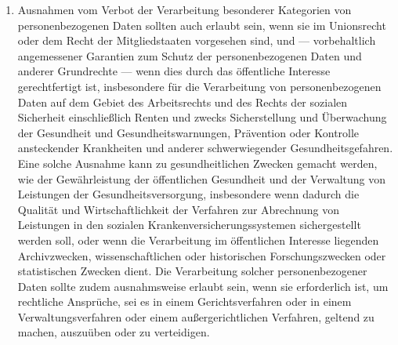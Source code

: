 \begin{enumerate}
   \item Ausnahmen vom Verbot der Verarbeitung besonderer Kategorien von personenbezogenen Daten sollten auch erlaubt
    sein, wenn sie im Unionsrecht oder dem Recht der Mitgliedstaaten vorgesehen sind, und — vorbehaltlich angemessener
    Garantien zum Schutz der personenbezogenen Daten und anderer Grundrechte — wenn dies durch das öffentliche
    Interesse gerechtfertigt ist, insbesondere für die Verarbeitung von personenbezogenen Daten auf dem Gebiet des
    Arbeitsrechts und des Rechts der sozialen Sicherheit einschließlich Renten und zwecks Sicherstellung und
    Überwachung der Gesundheit und Gesundheitswarnungen, Prävention oder Kontrolle ansteckender Krankheiten und anderer
    schwerwiegender Gesundheitsgefahren. Eine solche Ausnahme kann zu gesundheitlichen Zwecken gemacht werden, wie der
    Gewährleistung der öffentlichen Gesundheit und der Verwaltung von Leistungen der Gesundheitsversorgung,
    insbesondere wenn dadurch die Qualität und Wirtschaftlichkeit der Verfahren zur Abrechnung von Leistungen in den
    sozialen Krankenversicherungssystemen sichergestellt werden soll, oder wenn die Verarbeitung im öffentlichen
    Interesse liegenden Archivzwecken, wissenschaftlichen oder historischen Forschungszwecken oder statistischen
    Zwecken dient. Die Verarbeitung solcher personenbezogener Daten sollte zudem ausnahmsweise erlaubt sein, wenn sie
    erforderlich ist, um rechtliche Ansprüche, sei es in einem Gerichtsverfahren oder in einem Verwaltungsverfahren
    oder einem außergerichtlichen Verfahren, geltend zu machen, auszuüben oder zu verteidigen.%
   \label{eg:52}
   


\end{enumerate}
